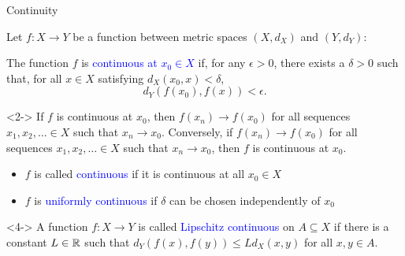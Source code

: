 \documentclass[10pt,english]{beamer}
\begin{document}
\begin{frame}{Continuity}

Let $f \colon X \rightarrow Y$ be a function between metric spaces $(X,d_X)$ and $(Y,d_Y)$:

\begin{definition}
The function $f$ is \textcolor{blue}{continuous at $x_0 \in X$} if, for any $\epsilon> 0$, there exists a $\delta >0$ such that, for all $x\in X$ satisfying $d_X(x_0,x)< \delta$, \vspace{-2mm}
\[ d_Y \left( f(x_0),f(x) \right) < \epsilon .\]
\end{definition}

\begin{theorem}<2-> 
If $f$ is continuous at $x_0$, then $f(x_n) \to f(x_0)$ for all sequences $x_1,x_2,\ldots \in X$ such that $x_n \to x_0$.
Conversely, if $f(x_n) \to f(x_0)$ for all sequences $x_1,x_2,\ldots  \in X$ such that $x_n \to x_0$, then $f$ is continuous at $x_0$.
\end{theorem}

\begin{itemize}
\setlength\itemsep{1.5mm}
\item<3-> $f$ is called \textcolor{blue}{continuous} if it is continuous at all $x_0 \in X$
\item<3-> $f$ is \textcolor{blue}{uniformly continuous} if $\delta$ can be chosen independently of $x_0$
\end{itemize}

\begin{definition}<4->
A function $f  \colon X \rightarrow Y$ is called \textcolor{blue}{Lipschitz continuous} on $A \subseteq X$ if there is a constant $L \in \mathbb{R}$ such that $d_Y (f(x),f(y)) \leq L d_X (x,y)$ for all $x,y\in A$.
\end{definition}



\end{frame}
\end{document}
